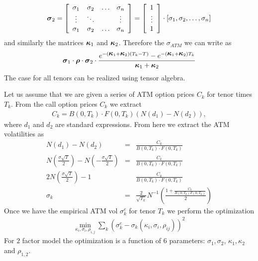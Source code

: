 \documentclass[12pt]{article}
\begin{document}
\begin{eqnarray*}
  \mbox {\boldmath ${\sigma}$}_2 = \left[ \begin{array}{cccc}
      \sigma_1 & \sigma_2 & \ldots & \sigma_n 
      \\
      \vdots & \ddots & & \vdots 
      \\
      \sigma_1 & \sigma_2 & \ldots & \sigma_n
    \end{array} 
  \right]
  = \left[ \begin{array}{c}
      1
      \\
      \vdots 
      \\
      1
    \end{array} 
  \right]
  \cdot 
  \left[ \sigma_1, \sigma_2, \ldots , \sigma_n \right]
\end{eqnarray*}
and similarly the matrices $\mbox {\boldmath ${\kappa}$}_1$ and $\mbox {\boldmath ${\kappa}$}_2$. 
Therefore the $\sigma_{ATM}$ we can write as 
\begin{eqnarray*}
  \mbox {\boldmath ${\sigma}$}_1 \cdot \mbox {\boldmath ${\rho}$} \cdot \mbox {\boldmath ${\sigma}$}_2  \cdot 
  \frac { e^{- (\mbox {\boldmath ${\kappa}$}_1 + \mbox {\boldmath ${\kappa}$}_2 ) (T_k - T)  } - e^{- (\mbox {\boldmath ${\kappa}$}_1 + \mbox {\boldmath ${\kappa}$}_2 ) T_k } }
    {\mbox {\boldmath ${\kappa}$}_1 + \mbox {\boldmath ${\kappa}$}_2 } 
\end{eqnarray*}
The case for all tenors can be realized using tensor algebra.

\vskip 5mm
%
\noindent
Let us assume that we are given a series of ATM option prices $C_k$ for tenor times $T_k$. From the call option prices $C_k$ we extract 
\begin{eqnarray*}
  C_k = B(0,T_k) \cdot F(0,T_k) ( N(d_1) - N(d_2) ),
\end{eqnarray*}
where $d_1$ and $d_2$ are standard expressions. From here we extract the ATM volatilities 
as 
\begin {eqnarray}
  N(d_1) - N(d_2) & = & \frac { C_k } { B(0,T_k) \cdot F(0,T_k) } 
  \nonumber
  \\
  N\left( \frac {\sigma \sqrt {T}} 2 \right) 
  - N \left( - \frac {\sigma \sqrt {T} } {2} \right) 
  & = & \frac { C_k } { B(0,T_k) \cdot F(0,T_k) } 
  \nonumber
  \\
  2 N \left( \frac {\sigma \sqrt {T}} 2 \right) - 1 & & 
  \frac { C_k } { B(0,T_k) \cdot F(0,T_k) } 
  \nonumber
  \\
  \sigma_k & = & \frac 2 { \sqrt {T_k} } N^{-1} 
  \left( 
  \frac {1 + \frac {C_k} {B(0,T_k) F(0,T_k)}} {2}
  \right)
  \label {implied_vol}
\end {eqnarray}
Once we have the empirical ATM vol $\sigma_k^e $ for tenor $T_k$ 
we perform the optimization 
\begin {eqnarray*}
  \min_{\kappa_i, \sigma_i, \rho_{i,j} } \sum_{k} (\sigma_k^e  - 
  \sigma_k (\kappa_i, \sigma_i, \rho_{ij} ) )^2 
\end {eqnarray*}
For $2$ factor model the optimization is a function of $6$ parameters: 
$\sigma_1, \sigma_2$, $ \kappa_1, \kappa_2 $ and $\rho_{1,2}$. 
\end{document}
